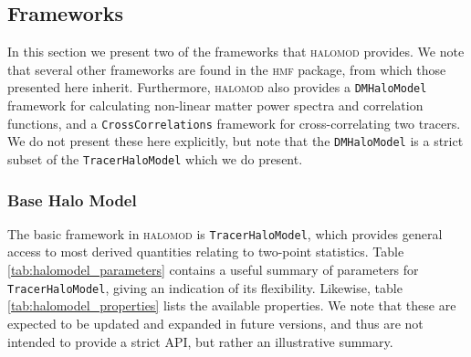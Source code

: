 \documentclass[5p,aas_macros]{elsarticle}
\begin{document}
\subsection{Frameworks}
\label{sec:halomod:frameworks}
In this section we present two of the frameworks that \textsc{halomod} provides. We note that several other frameworks are found in the \textsc{hmf} package, from which those presented here inherit. Furthermore, \textsc{halomod} also provides a \verb|DMHaloModel| framework for calculating non-linear matter power spectra and correlation functions, and a \texttt{Cross\-Correlations} framework for cross-correlating two tracers. We do not present these here explicitly, but note that the \verb|DMHaloModel| is a strict subset of the \verb|TracerHaloModel| which we do present.

\subsubsection{Base Halo Model}
\label{sec:halomod:frameworks:base}
The basic framework in \textsc{halomod} is \verb|TracerHaloModel|, which provides general access to most derived quantities relating to two-point statistics. Table \ref{tab:halomodel_parameters} contains a useful summary of parameters for \verb|TracerHaloModel|, giving an indication of its flexibility. Likewise, table \ref{tab:halomodel_properties} lists the available properties. We note that these are expected to be updated and expanded in future versions, and thus are not intended to provide a strict API, but rather an illustrative summary.
\end{document}
